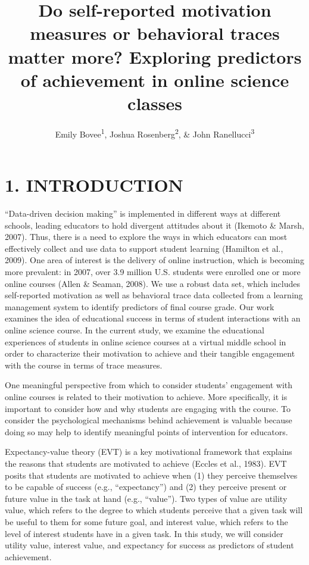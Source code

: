 \documentclass[,acmart]{apa6}
\title{Do self-reported motivation measures or behavioral traces matter more?
Exploring predictors of achievement in online science classes}
\author{Emily Bovee\textsuperscript{1}, Joshua Rosenberg\textsuperscript{2}, \&
John Ranellucci\textsuperscript{3}}
\date{}
\affiliation{
\vspace{0.5cm}
\textsuperscript{1} Michigan State University\\\textsuperscript{2} University of Tennessee, Knoxville\\\textsuperscript{3} Hunter College}
\begin{document}
\maketitle

\section{1. INTRODUCTION}\label{introduction}

\enquote{Data-driven decision making} is implemented in different ways
at different schools, leading educators to hold divergent attitudes
about it (Ikemoto \& Marsh, 2007). Thus, there is a need to explore the
ways in which educators can most effectively collect and use data to
support student learning (Hamilton et al., 2009). One area of interest
is the delivery of online instruction, which is becoming more prevalent:
in 2007, over 3.9 million U.S. students were enrolled one or more online
courses (Allen \& Seaman, 2008). We use a robust data set, which
includes self-reported motivation as well as behavioral trace data
collected from a learning management system to identify predictors of
final course grade. Our work examines the idea of educational success in
terms of student interactions with an online science course. In the
current study, we examine the educational experiences of students in
online science courses at a virtual middle school in order to
characterize their motivation to achieve and their tangible engagement
with the course in terms of trace measures.

One meaningful perspective from which to consider students' engagement
with online courses is related to their motivation to achieve. More
specifically, it is important to consider how and why students are
engaging with the course. To consider the psychological mechanisms
behind achievement is valuable because doing so may help to identify
meaningful points of intervention for educators.

Expectancy-value theory (EVT) is a key motivational framework that
explains the reasons that students are motivated to achieve (Eccles et
al., 1983). EVT posits that students are motivated to achieve when (1)
they perceive themselves to be capable of success (e.g.,
\enquote{expectancy}) and (2) they perceive present or future value in
the task at hand (e.g., \enquote{value}). Two types of value are utility
value, which refers to the degree to which students perceive that a
given task will be useful to them for some future goal, and interest
value, which refers to the level of interest students have in a given
task. In this study, we will consider utility value, interest value, and
expectancy for success as predictors of student achievement.
\end{document}
